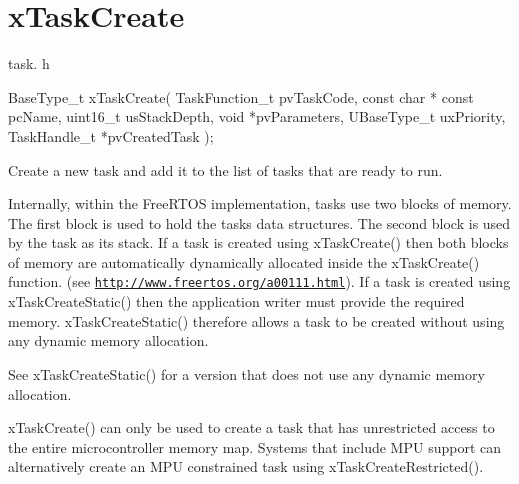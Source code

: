 \hypertarget{group__xTaskCreate}{}\section{x\+Task\+Create}
\label{group__xTaskCreate}
task. h 
\begin{DoxyPre}
BaseType\_t xTaskCreate(
                          TaskFunction\_t pvTaskCode,
                          const char * const pcName,
                          uint16\_t usStackDepth,
                          void *pvParameters,
                          UBaseType\_t uxPriority,
                          TaskHandle\_t *pvCreatedTask
                      );\end{DoxyPre}


Create a new task and add it to the list of tasks that are ready to run.

Internally, within the Free\+R\+T\+OS implementation, tasks use two blocks of memory. The first block is used to hold the task\textquotesingle{}s data structures. The second block is used by the task as its stack. If a task is created using x\+Task\+Create() then both blocks of memory are automatically dynamically allocated inside the x\+Task\+Create() function. (see \href{http://www.freertos.org/a00111.html}{\tt http\+://www.\+freertos.\+org/a00111.\+html}). If a task is created using x\+Task\+Create\+Static() then the application writer must provide the required memory. x\+Task\+Create\+Static() therefore allows a task to be created without using any dynamic memory allocation.

See x\+Task\+Create\+Static() for a version that does not use any dynamic memory allocation.

x\+Task\+Create() can only be used to create a task that has unrestricted access to the entire microcontroller memory map. Systems that include M\+PU support can alternatively create an M\+PU constrained task using x\+Task\+Create\+Restricted().


